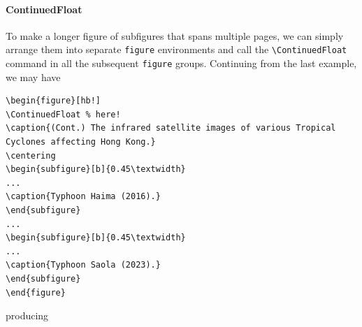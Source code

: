 \paragraph{ContinuedFloat} To make a longer figure of subfigures that spans multiple pages, we can simply arrange them into separate \verb|figure| environments and call the \texttt{\textbackslash ContinuedFloat} command in all the subsequent \verb|figure| groups. Continuing from the last example, we may have
\begin{lstlisting}
\begin{figure}[hb!]
\ContinuedFloat % here!
\caption{(Cont.) The infrared satellite images of various Tropical Cyclones affecting Hong Kong.}
\centering
\begin{subfigure}[b]{0.45\textwidth}
...
\caption{Typhoon Haima (2016).}
\end{subfigure}
...
\begin{subfigure}[b]{0.45\textwidth}
...
\caption{Typhoon Saola (2023).}
\end{subfigure}
\end{figure}    
\end{lstlisting}
producing
